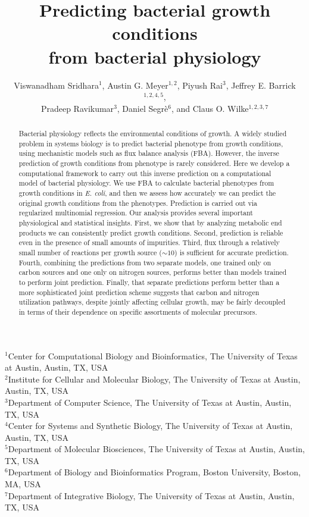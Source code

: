 \documentclass[12pt]{article}
\begin{document}
\title{Predicting bacterial growth conditions\\from bacterial physiology}

\author{Viswanadham Sridhara$^1$, Austin G. Meyer$^{1,2}$, Piyush Rai$^3$, Jeffrey E. Barrick$^{1,2,4,5}$,\\
Pradeep Ravikumar$^3$, Daniel Segr\`e$^6$, and Claus O. Wilke$^{1,2,3,7}$}
\maketitle

\noindent
$^1$Center for Computational Biology and Bioinformatics, The University of Texas at Austin, Austin, TX, USA\\
$^2$Institute for Cellular and Molecular Biology, The University of Texas at Austin, Austin, TX, USA\\
$^3$Department of Computer Science, The University of Texas at Austin, Austin, TX, USA\\
$^4$Center for Systems and Synthetic Biology, The University of Texas at Austin, Austin, TX, USA\\
$^5$Department of Molecular Biosciences, The University of Texas at Austin, Austin, TX, USA\\
$^6$Department of Biology and Bioinformatics Program, Boston University, Boston, MA, USA\\
$^7$Department of Integrative Biology, The University of Texas at Austin, Austin, TX, USA\\


\begin{abstract}
Bacterial physiology reflects the environmental conditions of growth. A widely studied problem in systems biology is to predict bacterial phenotype from growth conditions, using mechanistic models such as flux balance analysis (FBA). However, the inverse prediction of growth conditions from phenotype is rarely considered. Here we develop a computational framework to carry out this inverse prediction on a computational model of bacterial physiology. We use FBA to calculate bacterial phenotypes from growth conditions in \emph{E. coli}, and then we assess how accurately we can predict the original growth conditions from the phenotypes. Prediction is carried out via regularized multinomial regression. Our analysis provides several important physiological and statistical insights. First, we show that by analyzing metabolic end products we can consistently predict growth conditions. Second, prediction is reliable even in the presence of small amounts of impurities. Third, flux through a relatively small number of reactions per growth source ($\mathord{\sim}10$) is sufficient for accurate prediction. Fourth, combining the predictions from two separate models, one trained only on carbon sources and one only on nitrogen sources, performs better than models trained to perform joint prediction. Finally, that separate predictions perform better than a more sophisticated joint prediction scheme suggests that carbon and nitrogen utilization pathways, despite jointly affecting cellular growth, may be fairly decoupled in terms of their dependence on specific assortments of molecular precursors.
\end{abstract}
\end{document}
